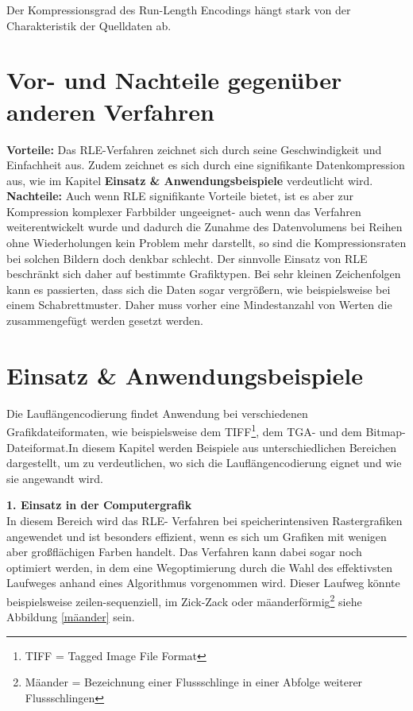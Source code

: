 \documentclass[11pt,a4paper,ngerman]{report}
\begin{document}
  		  Der Kompressionsgrad des Run-Length Encodings hängt stark von der Charakteristik der Quelldaten ab. \cite[Seite 62]{Lange2021}
  		 
  		 
  		 
	
		\section{Vor- und Nachteile gegenüber anderen Verfahren}
		\textbf{Vorteile:}
		Das RLE-Verfahren zeichnet sich durch seine Geschwindigkeit und Einfachheit aus. Zudem zeichnet es sich durch eine signifikante Datenkompression aus, wie im Kapitel \textbf{Einsatz \& Anwendungsbeispiele} verdeutlicht wird.
		\\
		\textbf{Nachteile:}
		Auch wenn RLE signifikante Vorteile bietet, ist es aber zur Kompression komplexer Farbbilder ungeeignet- auch wenn das Verfahren weiterentwickelt wurde und dadurch die Zunahme des Datenvolumens bei Reihen ohne Wiederholungen kein Problem mehr darstellt, so sind die Kompressionsraten bei solchen Bildern doch denkbar schlecht. Der sinnvolle Einsatz von RLE beschränkt sich daher auf bestimmte Grafiktypen.\cite{Koeck2006}	Bei sehr kleinen Zeichenfolgen kann es passierten, dass sich die Daten sogar vergrößern, wie beispielsweise bei einem Schabrettmuster. Daher muss vorher eine Mindestanzahl von Werten die zusammengefügt werden gesetzt werden.
		
		
		
		
		
		\section{Einsatz \& Anwendungsbeispiele}
		Die Lauflängencodierung findet Anwendung bei verschiedenen Grafikdateiformaten, wie beispielsweise dem TIFF\footnote{TIFF = Tagged Image File Format}, dem TGA- und dem Bitmap- Dateiformat.In diesem Kapitel werden  Beispiele aus unterschiedlichen Bereichen dargestellt, um zu verdeutlichen, wo sich die Lauflängencodierung eignet und wie sie angewandt wird.
	
		\textbf{1. Einsatz in der Computergrafik}
		\\
		In diesem Bereich wird das RLE- Verfahren bei speicherintensiven Rastergrafiken angewendet und ist besonders effizient, wenn es sich um Grafiken mit wenigen aber großflächigen Farben handelt. Das Verfahren kann dabei sogar noch optimiert werden, in dem eine Wegoptimierung durch die Wahl des effektivsten Laufweges anhand eines Algorithmus vorgenommen wird.  Dieser Laufweg könnte beispielsweise zeilen-sequenziell, im Zick-Zack oder mäanderförmig\footnote{Mäander = Bezeichnung einer Flussschlinge in einer Abfolge weiterer Flussschlingen } siehe Abbildung \ref{mäander} sein.
\end{document}
